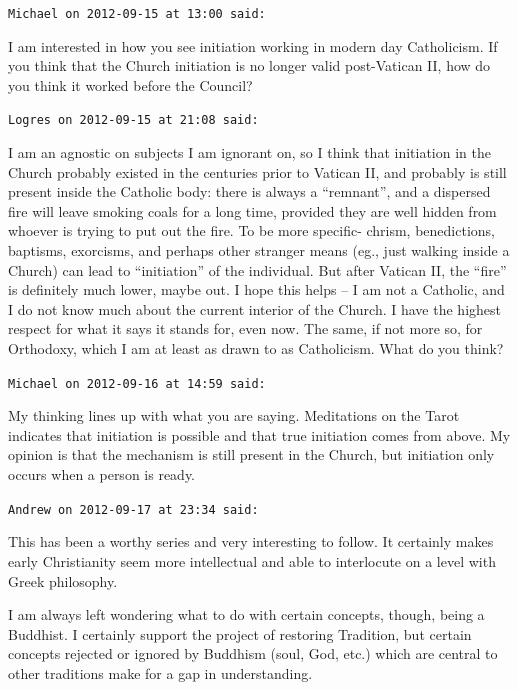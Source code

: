 \begin{footnotesize}
\begin{sffamily}
\texttt{Michael on 2012-09-15 at 13:00 said:}

I am interested in how you see initiation working in modern day Catholicism. If you think that the Church initiation is no longer valid post-Vatican II, how do you think it worked before the Council?

\hfill

\texttt{Logres on 2012-09-15 at 21:08 said:}

I am an agnostic on subjects I am ignorant on, so I think that initiation in the Church probably existed in the centuries prior to Vatican II, and probably is still present inside the Catholic body: there is always a ``remnant'', and a dispersed fire will leave smoking coals for a long time, provided they are well hidden from whoever is trying to put out the fire. To be more specific- chrism, benedictions, baptisms, exorcisms, and perhaps other stranger means (eg., just walking inside a Church) can lead to ``initiation'' of the individual. But after Vatican II, the ``fire'' is definitely much lower, maybe out. I hope this helps -- I am not a Catholic, and I do not know much about the current interior of the Church. I have the highest respect for what it says it stands for, even now. The same, if not more so, for Orthodoxy, which I am at least as drawn to as Catholicism. What do you think?

\hfill

\texttt{Michael on 2012-09-16 at 14:59 said:}

My thinking lines up with what you are saying. Meditations on the Tarot indicates that initiation is possible and that true initiation comes from above. My opinion is that the mechanism is still present in the Church, but initiation only occurs when a person is ready.

\hfill

\texttt{Andrew on 2012-09-17 at 23:34 said:}

This has been a worthy series and very interesting to follow. It certainly makes early Christianity seem more intellectual and able to interlocute on a level with Greek philosophy.

I am always left wondering what to do with certain concepts, though, being a Buddhist. I certainly support the project of restoring Tradition, but certain concepts rejected or ignored by Buddhism (soul, God, etc.) which are central to other traditions make for a gap in understanding.


\end{sffamily}
\end{footnotesize}
